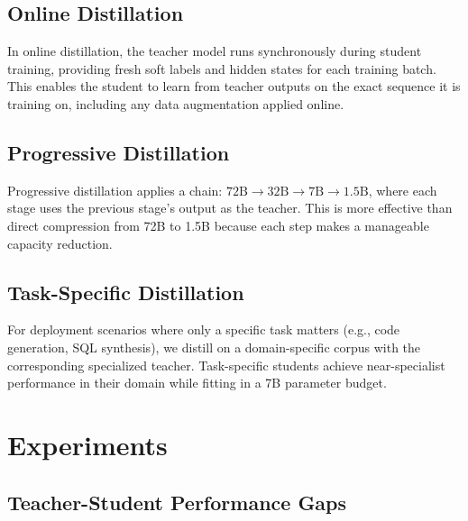 \documentclass[11pt,a4paper]{article}
\begin{document}
\subsection{Online Distillation}

In online distillation, the teacher model runs synchronously during student training,
providing fresh soft labels and hidden states for each training batch. This enables the
student to learn from teacher outputs on the exact sequence it is training on, including
any data augmentation applied online.

\subsection{Progressive Distillation}

Progressive distillation \cite{hinton2015distilling,salimans2022progressive} applies a
chain: $72\text{B} \to 32\text{B} \to 7\text{B} \to 1.5\text{B}$, where each stage
uses the previous stage's output as the teacher. This is more effective than direct
compression from 72B to 1.5B because each step makes a manageable capacity reduction.

\subsection{Task-Specific Distillation}

For deployment scenarios where only a specific task matters (e.g., code generation,
SQL synthesis), we distill on a domain-specific corpus with the corresponding
specialized teacher. Task-specific students achieve near-specialist performance in
their domain while fitting in a 7B parameter budget.

\section{Experiments}
\label{sec:experiments}

\subsection{Teacher-Student Performance Gaps}
\end{document}
